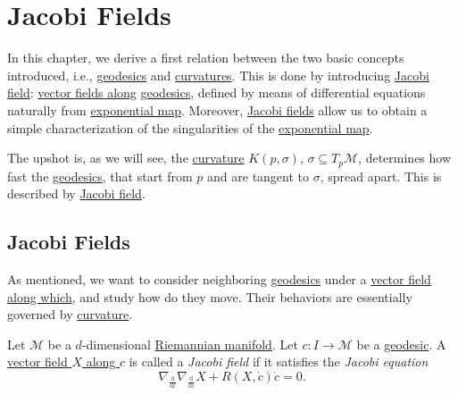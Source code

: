\chapter{Jacobi Fields}

In this chapter, we derive a first relation between the two basic concepts introduced, i.e., \hyperref[def:geodesic]{geodesics} and \hyperref[def:Riemannian-curvature]{curvatures}. This is done by introducing \hyperref[def:Jacobi-field]{Jacobi field}: \hyperref[def:vector-field-along-curve]{vector fields along} \hyperref[def:geodesic]{geodesics}, defined by means of differential equations naturally from \hyperref[def:exponential-map]{exponential map}. Moreover, \hyperref[def:Jacobi-field]{Jacobi fields} allow us to obtain a simple characterization of the singularities of the \hyperref[def:exponential-map]{exponential map}.

\begin{intuition}
	The upshot is, as we will see, the \hyperref[def:sectional-curvature]{curvature} \(K(p, \sigma )\), \(\sigma \subseteq T_p \mathcal{M} \), determines how fast the \hyperref[def:geodesic]{geodesics}, that start from \(p\) and are tangent to \(\sigma \), spread apart. This is described by \hyperref[def:Jacobi-field]{Jacobi field}.
\end{intuition}

\section{Jacobi Fields}
As mentioned, we want to consider neighboring \hyperref[def:geodesic]{geodesics} under a \hyperref[def:vector-field-along-curve]{vector field along which}, and study how do they move. Their behaviors are essentially governed by \hyperref[def:Riemannian-curvature]{curvature}.

\begin{definition}\label{def:Jacobi-field}
	Let \(\mathcal{M} \) be a \(d\)-dimensional \hyperref[def:Riemannian-manifold]{Riemannian manifold}. Let \(c\colon I \to \mathcal{M} \) be a \hyperref[def:geodesic]{geodesic}. A \hyperref[def:vector-field-along-curve]{vector field \(X\) along \(c\)} is called a \emph{Jacobi field} if it satisfies the \emph{Jacobi equation}
	\begin{equation}\label{eq:Jacobi}
		\nabla _{\frac{\mathrm{d}}{\mathrm{d}t} }\nabla _{\frac{\mathrm{d}}{\mathrm{d}t} }X + R(X, \dot{c} )\dot{c} = 0.
	\end{equation}
\end{definition}


